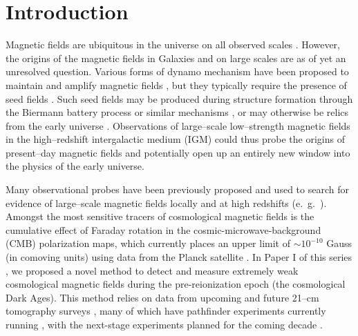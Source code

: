 \section{Introduction}
\label{sec:intro}

Magnetic fields are ubiquitous in the universe on all observed scales \cite{2013A&ARv..21...62D,Vallee04,Neronov10,2005LNP...664...89W,2012SSRv..166..215B}. However, the origins of the magnetic fields in Galaxies and on large scales are as of yet an unresolved question. Various forms of dynamo mechanism have been proposed to maintain and amplify magnetic fields \cite{2013PhRvE..87e3110P}, but they typically require the presence of seed fields \cite{2013A&ARv..21...62D}. Such seed fields may be produced during structure formation through the Biermann battery process or similar mechanisms \cite{Naoz13,2013PhRvL.111e1303N}, or may otherwise be relics from the early universe \cite{2013A&ARv..21...62D,2012SSRv..166...37W,2014JCAP...05..040K}. Observations of large--scale low--strength magnetic fields in the high--redshift intergalactic medium (IGM) could thus probe the origins of present--day magnetic fields and potentially open up an entirely new window into the physics of the early universe.

Many observational probes have been previously proposed and used to search for evidence of large--scale magnetic fields locally and at high redshifts (e.~g.~\cite{Yamazaki10,Blasi99,Tavecchio10,Dolag11,2005LNP...664...89W,2014JCAP...01..009K,2013ApJ...770...47K,2014PhRvD..89j3522S,2006MNRAS.372.1060T,2009ApJ...692..236S}). Amongst the most sensitive tracers of cosmological magnetic fields is the cumulative effect of Faraday rotation in the cosmic-microwave-background (CMB) polarization maps, which currently places an upper limit of $\sim$$10^{-10}$ Gauss (in comoving units) using data from the Planck satellite \cite{2015arXiv150201594P}. In Paper I of this series \cite{2014arXiv1410.2250V}, we proposed a novel method to detect and measure extremely weak cosmological magnetic fields during the pre-reionization epoch (the cosmological Dark Ages). This method relies on data from upcoming and future 21--cm tomography surveys \cite{1997ApJ...475..429M,2004PhRvL..92u1301L}, many of which have pathfinder experiments currently running \cite{2012arXiv1201.1700G,2011AAS...21813206B,2014ApJ...788..106P,2008arXiv0802.1727C,Vanderlinde14,2015AAS...22532803D}, with the next-stage experiments planned for the coming decade \cite{2008arXiv0802.1727C,2015AAS...22532803D}. 

